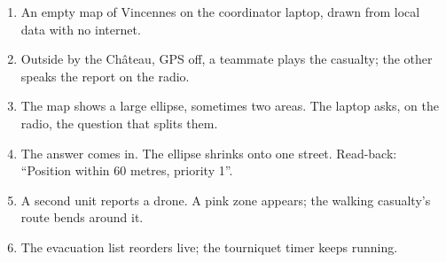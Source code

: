 \begin{enumerate}
  \item An empty map of Vincennes on the coordinator laptop, drawn from local data with no internet.
  \item Outside by the Château, GPS off, a teammate plays the casualty; the other speaks the report on the radio.
  \item The map shows a large ellipse, sometimes two areas. The laptop asks, on the radio, the question
        that splits them.
  \item The answer comes in. The ellipse shrinks onto one street. Read-back: ``Position within 60 metres,
        priority 1''.
  \item A second unit reports a drone. A pink zone appears; the walking casualty's route bends around it.
  \item The evacuation list reorders live; the tourniquet timer keeps running.
\end{enumerate}
